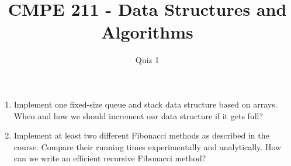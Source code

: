 \documentclass{article}
\begin{document}
\author{Quiz 1}
\title{CMPE 211 - Data Structures and Algorithms}




\date{}
\maketitle
\setcounter{secnumdepth}{0}
\begin{enumerate}
\item Implement one fixed-size queue and stack data structure based on arrays. When and how we should increment our data structure if it gets full?
\item Implement at least two different Fibonacci methods as described in the course. Compare their running times experimentally and analytically. How can we write an efficient recursive Fibonacci method?

\end{enumerate}
\end{document}
